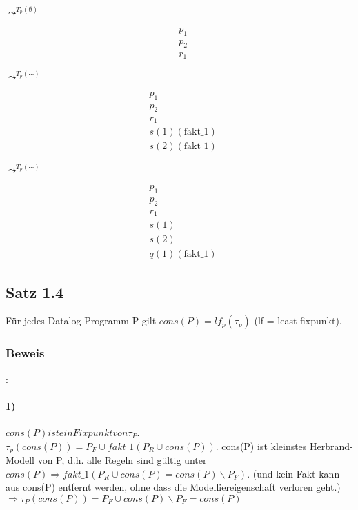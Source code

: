 \documentclass[12pt, a4paper]{article}
\begin{document}
$\leadsto^{T_p(\emptyset)}$

\begin{equation}
\begin{split}
&p_1\\
&p_2 \\
&r_1
\end{split}
\end{equation}

$\leadsto^{T_p(\cdots)}$

\begin{equation}
\begin{split}
&p_1\\
&p_2 \\
&r_1\\
&s(1) (\text{fakt\_1}) \\
&s(2) (\text{fakt\_1})
\end{split}
\end{equation}

$\leadsto^{T_p(\cdots)}$

\begin{equation}
\begin{split}
&p_1\\
&p_2 \\
&r_1\\
&s(1) \\
&s(2) \\
&q(1) (\text{fakt\_1})
\end{split}
\end{equation}

\subsection{Satz 1.4} Für jedes Datalog-Programm P gilt $cons(P) = lf_p(\tau_p)$ (lf = least fixpunkt).

\subsubsection{Beweis}:
\paragraph{1)} $cons(P) ist ein Fixpunkt von \tau_P$. \\
$\tau_p(cons(P)) = P_F \cup fakt\_1(P_R \cup cons(P))$. cons(P) ist kleinstes Herbrand-Modell von P, d.h. alle Regeln sind gültig unter $cons(P) \Rightarrow fakt\_1(P_R \cup cons(P) = cons(P) \backslash P_F)$. (und kein Fakt kann aus cons(P) entfernt werden, ohne dass die Modelliereigenschaft verloren geht.) $\Rightarrow \tau_P(cons(P)) = P_F \cup cons(P) \backslash P_F = cons(P)$
\end{document}
